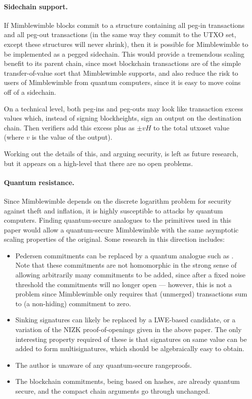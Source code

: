 \documentclass[letterpaper]{article}
\begin{document}
\paragraph{Sidechain support.} If Mimblewimble blocks commit to a structure
containing all peg-in transactions and all peg-out transactions (in the
same way they commit to the UTXO set, except these structures will never
shrink), then it is possible for Mimblewimble to be implemented as a
pegged sidechain. This would provide a tremendous scaling benefit to its
parent chain, since most blockchain transactions are of the simple
transfer-of-value sort that Mimblewimble supports, and also reduce the
risk to users of Mimblewimble from quantum computers, since it is easy to
move coins off of a sidechain.

On a technical level, both peg-ins and peg-outs may look like transaction
excess values which, instead of signing blockheights, sign an output on the
destination chain. Then verifiers add this excess plus as $\pm vH$ to the
total utxoset value (where $v$ is the value of the output).

Working out the details of this, and arguing security, is left as future
research, but it appears on a high-level that there are no open problems.

\paragraph{Quantum resistance.} Since Mimblewimble depends on the discrete
logarithm problem for security against theft and inflation, it is highly
susceptible to attacks by quantum computers. Finding quantum-secure
analogues to the primitives used in this paper would allow a quantum-secure
Mimblewimble with the same asymptotic scaling properties of the original.
Some research in this direction includes:
\begin{itemize}
\item Pedersen commitments can be replaced by a quantum analogue such as
\cite{cabarcas+demirel+goepfert+lancrenon+wunderer2015}. Note that these
commitments are not homomorphic in the strong sense of allowing arbitrarily
many commitments to be added, since after a fixed noise threshold the
commitments will no longer open --- however, this is not a problem since
Mimblewimble only requires that (unmerged) transactions sum to (a non-hiding)
commitment to zero.

\item Sinking signatures can likely be replaced by a LWE-based candidate,
or a variation of the NIZK proof-of-openings given in the above paper. The
only interesting property required of these is that signatures on same value
can be added to form multisignatures, which should be algebraically easy to
obtain.

\item The author is unaware of any quantum-secure rangeproofs.

\item The blockchain commitments, being based on hashes, are already quantum
secure, and the compact chain arguments go through unchanged.
\end{itemize}
\end{document}
